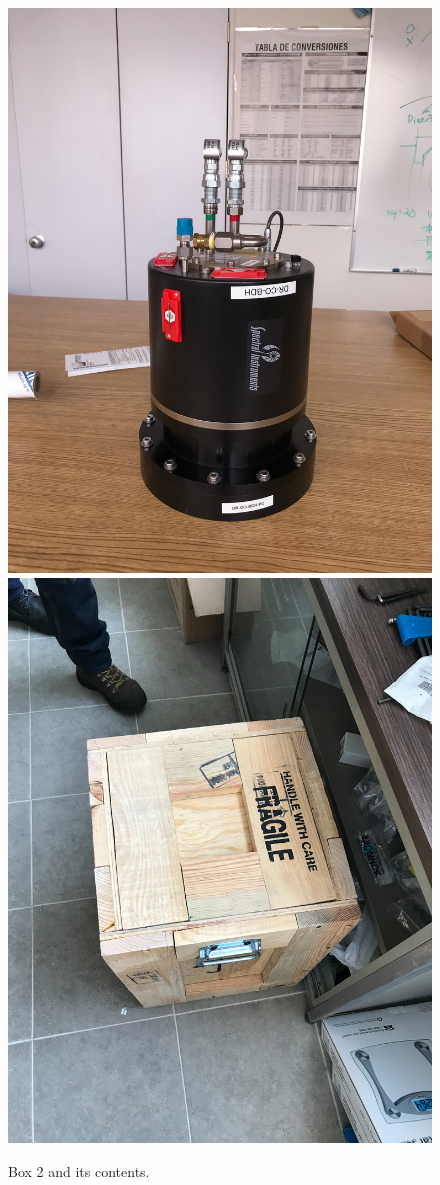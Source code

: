 \documentclass{article}
\begin{document}
\begin{figure}[bp]
\begin{center}
\includegraphics[width=0.30\linewidth]{figures/20201210T100146.jpg}
\includegraphics[width=0.30\linewidth]{figures/20201210T101147.jpg}\\
\end{center}
\caption{Box 2 and its contents.}
\label{figure:box-two}
\end{figure}
\end{document}
